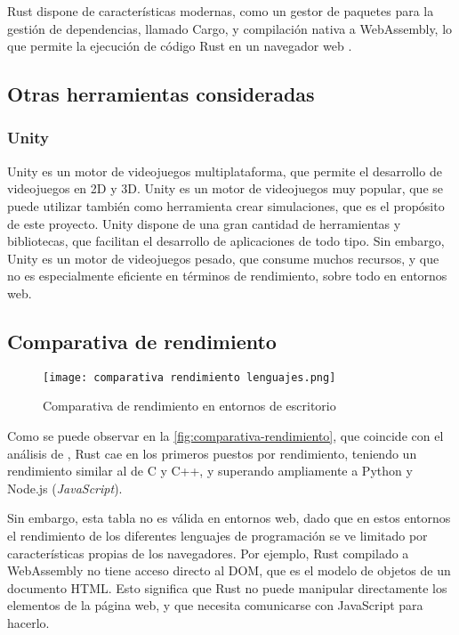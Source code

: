Rust dispone de características modernas, como un gestor de paquetes para la gestión de dependencias, llamado Cargo, y compilación nativa a WebAssembly, lo que permite la ejecución de código Rust en un navegador web \autocite{WebAssembly}.

\subsection{Otras herramientas consideradas}
\subsubsection{Unity}
Unity es un motor de videojuegos multiplataforma, que permite el desarrollo de videojuegos en 2D y 3D. Unity es un motor de videojuegos muy popular, que se puede utilizar también como herramienta crear simulaciones, que es el propósito de este proyecto. Unity dispone de una gran cantidad de herramientas y bibliotecas, que facilitan el desarrollo de aplicaciones de todo tipo. Sin embargo, Unity es un motor de videojuegos pesado, que consume muchos recursos, y que no es especialmente eficiente en términos de rendimiento, sobre todo en entornos web.

\subsection{Comparativa de rendimiento}

\begin{figure}[H]
    \centering
    \texttt{[image: comparativa rendimiento lenguajes.png]}
    \caption{Comparativa de rendimiento en entornos de escritorio \autocite{zotero-16}}
    \label{fig:comparativa-rendimiento}
\end{figure}


Como se puede observar en la \autoref{fig:comparativa-rendimiento}, que coincide con el análisis de \autocite{samTop10Fastest2024}, Rust cae en los primeros puestos por rendimiento, teniendo un rendimiento similar al de C y C++, y superando ampliamente a Python y Node.js (\textit{JavaScript}).

Sin embargo, esta tabla no es válida en entornos web, dado que en estos entornos el rendimiento de los diferentes lenguajes de programación se ve limitado por características propias de los navegadores. Por ejemplo, Rust compilado a WebAssembly no tiene acceso directo al \ac{DOM}, que es el modelo de objetos de un documento HTML. Esto significa que Rust no puede manipular directamente los elementos de la página web, y que necesita comunicarse con JavaScript para hacerlo. 

